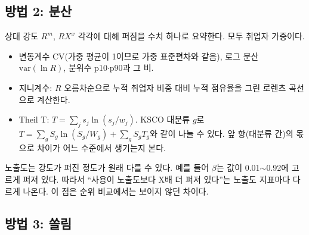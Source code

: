 \documentclass[11pt]{article}
\begin{document}
\subsection{방법 2: 분산}

상대 강도 $R^m$, $RX^x$ 각각에 대해 퍼짐을 수치 하나로 요약한다. 모두 취업자 가중이다.
\begin{itemize}[leftmargin=*]
  \item 변동계수 CV(가중 평균이 1이므로 가중 표준편차와 같음), 로그 분산 $\mathrm{var}(\ln R)$, 분위수 p10$\cdot$p90과 그 비.
  \item 지니계수: $R$ 오름차순으로 누적 취업자 비중 대비 누적 점유율을 그린 로렌츠 곡선으로 계산한다.
  \item Theil T: $T = \sum_j s_j \ln(s_j / w_j)$. KSCO 대분류 $g$로 $T = \sum_g S_g \ln(S_g / W_g) + \sum_g S_g T_g$와 같이 나눌 수 있다. 앞 항(대분류 간)의 몫으로 차이가 어느 수준에서 생기는지 본다.
\end{itemize}
노출도는 강도가 퍼진 정도가 원래 다를 수 있다. 예를 들어 $\beta$는 값이 0.01$\sim$0.92에 고르게 퍼져 있다. 따라서 ``사용이 노출도보다 X배 더 퍼져 있다''는 노출도 지표마다 다르게 나온다. 이 점은 순위 비교에서는 보이지 않던 차이다.

\subsection{방법 3: 쏠림}
\end{document}
